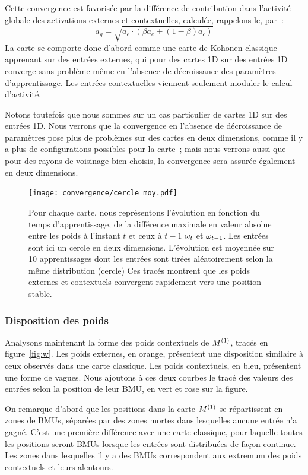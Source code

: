 \documentclass[../main]{subfiles}
\begin{document}
Cette convergence est favorisée par la différence de contribution dans l'activité globale des activations externes et contextuelles, calculée, rappelons le, par~: 
$$ a_g = \sqrt{a_e \cdot (\beta a_e + (1-\beta)a_c)}$$
La carte se comporte donc d'abord comme une carte de Kohonen classique apprenant sur des entrées externes, qui pour des cartes 1D sur des entrées 1D converge sans problème même en l'absence de décroissance des paramètres d'apprentissage. 
Les entrées contextuelles viennent seulement moduler le calcul d'activité.

Notons toutefois que nous sommes sur un cas particulier de cartes 1D sur des entrées 1D.
Nous verrons que la convergence en l'absence de décroissance de paramètres pose plus de problèmes sur des cartes en deux dimensions, comme il y a plus de configurations possibles pour la carte~; mais nous verrons aussi que pour des rayons de voisinage bien choisis, la convergence sera assurée également en deux dimensions.

\begin{figure}
	\texttt{[image: convergence/cercle\_moy.pdf]}
	\caption{Pour chaque carte, nous représentons l'évolution en fonction du temps d'apprentissage, de la différence maximale en valeur absolue entre les poids à l'instant $t$ et ceux à $t-1$ $\omega_t$ et $\omega_{t-1}$. Les entrées sont ici un cercle en deux dimensions. L'évolution est moyennée sur 10 apprentissages dont les entrées sont tirées aléatoirement selon la même distribution (cercle)
	Ces tracés montrent que les poids externes et contextuels convergent rapidement vers une position stable.\label{fig:conv}}
\end{figure}


\subsubsection{Disposition des poids}

Analysons maintenant la forme des poids contextuels de $M^{({1})}$, tracés en figure~\ref{fig:w}.
Les poids externes, en orange, présentent une disposition similaire à ceux observés dans une carte classique. Les poids contextuels, en bleu, présentent une forme de vagues. Nous ajoutons à ces deux courbes le tracé des valeurs des entrées selon la position de leur BMU, en vert et rose sur la figure.

On remarque d'abord que les positions dans la carte $M^{({1})}$ se répartissent en zones de BMUs, séparées par des zones mortes dans lesquelles aucune entrée n'a gagné. 
C'est une première différence avec une carte classique, pour laquelle toutes les positions seront BMUs lorsque les entrées sont distribuées de façon continue.
Les zones dans lesquelles il y a des BMUs correspondent aux extremum des poids contextuels et leurs alentours.
\end{document}
